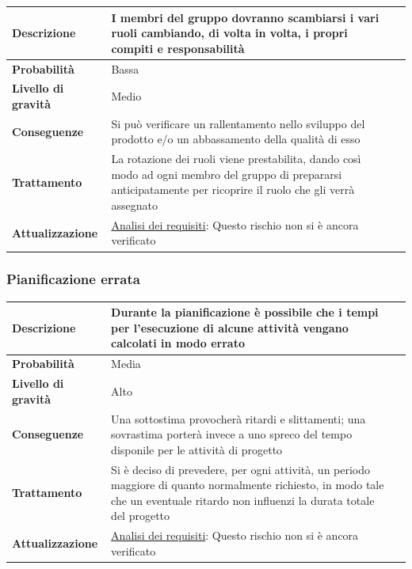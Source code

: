 \begin{center}
	
	\begin{tabular}{|>{\centering}m{4cm} ||>{\centering}m{8cm} |>{\centering\arraybackslash}m{0pt}@{}|}
		\hline
		\textbf{Descrizione} & I membri del gruppo dovranno scambiarsi i vari ruoli cambiando, di volta in volta, i propri compiti e responsabilità & \\[2ex]
		\hline	
		\textbf{Probabilità} & Bassa &\\[1ex]
		\hline
		\textbf{Livello di gravità} & Medio & \\[1ex]
		\hline
		\textbf{Conseguenze} & Si può verificare un rallentamento nello sviluppo del prodotto e/o un abbassamento della qualità di esso & \\[1ex]
		\hline
		\textbf{Trattamento} & La rotazione dei ruoli viene prestabilita, dando così modo ad ogni membro del gruppo di prepararsi anticipatamente per ricoprire il ruolo che gli verrà assegnato & \\[1ex] 
		\hline
		\textbf{Attualizzazione} & \underline{Analisi dei requisiti}: Questo rischio non si è ancora verificato & \\[1ex]
		\hline
	\end{tabular}
	
\end{center}
\newpage
\subsubsection{Pianificazione errata}

\begin{center}
	
	\begin{tabular}{|>{\centering}m{4cm} ||>{\centering}m{8cm} |>{\centering\arraybackslash}m{0pt}@{}|}
		\hline
		\textbf{Descrizione} & Durante la pianificazione è possibile che i tempi per l’esecuzione di alcune attività vengano calcolati in modo errato & \\[2ex]
		\hline	
		\textbf{Probabilità} & Media &\\[1ex]
		\hline
		\textbf{Livello di gravità} & Alto & \\[1ex]
		\hline
		\textbf{Conseguenze} & Una sottostima provocherà ritardi e slittamenti; una sovrastima porterà invece a uno spreco del tempo disponile per le attività di progetto & \\[1ex]
		\hline
		\textbf{Trattamento} & Si è deciso di prevedere, per ogni attività, un periodo maggiore di quanto normalmente richiesto, in modo tale che un eventuale ritardo non influenzi la durata totale del progetto & \\[1ex] 
		\hline
		\textbf{Attualizzazione} & \underline{Analisi dei requisiti}: Questo rischio non si è ancora verificato & \\[1ex]
		\hline
	\end{tabular}
	
\end{center}

